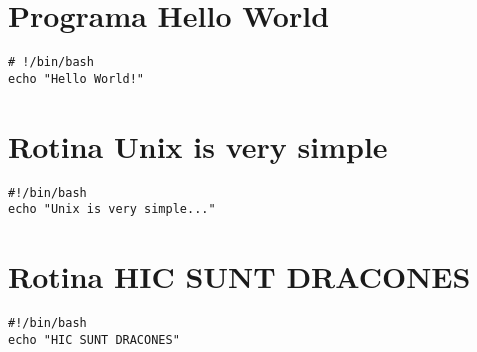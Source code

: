 \begin{apendicesenv}
\partapendices

\chapter{Programa Hello World} 
\label{chap:apendiceA}

\begin{lstlisting}
# !/bin/bash
echo "Hello World!"
\end{lstlisting}

\chapter{Rotina Unix is very simple} 
\label{chap:apendiceB}
\begin{lstlisting}
#!/bin/bash
echo "Unix is very simple..."
\end{lstlisting}

\chapter{Rotina HIC SUNT DRACONES} 
\label{chap:apendiceC}
\begin{lstlisting}
#!/bin/bash
echo "HIC SUNT DRACONES"
\end{lstlisting}



\end{apendicesenv}
